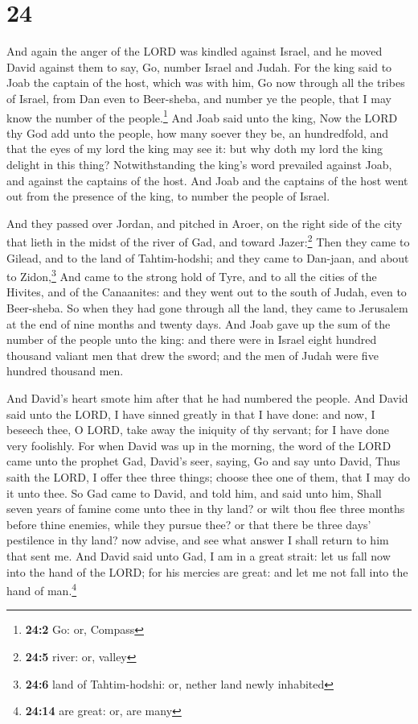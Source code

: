 \hypertarget{section-23}{%
\section{24}\label{section-23}}

 And again the anger of the LORD was kindled against
Israel, and he moved David against them to say, Go, number Israel and
Judah.  For the king said to Joab the captain of the host,
which was with him, Go now through all the tribes of Israel, from Dan
even to Beer-sheba, and number ye the people, that I may know the number
of the people.\footnote{\textbf{24:2} Go: or, Compass} 
And Joab said unto the king, Now the LORD thy God add unto the people,
how many soever they be, an hundredfold, and that the eyes of my lord
the king may see it: but why doth my lord the king delight in this
thing?  Notwithstanding the king's word prevailed against
Joab, and against the captains of the host. And Joab and the captains of
the host went out from the presence of the king, to number the people of
Israel.

 And they passed over Jordan, and pitched in Aroer, on the
right side of the city that lieth in the midst of the river of Gad, and
toward Jazer:\footnote{\textbf{24:5} river: or, valley} 
Then they came to Gilead, and to the land of Tahtim-hodshi; and they
came to Dan-jaan, and about to Zidon,\footnote{\textbf{24:6} land of
  Tahtim-hodshi: or, nether land newly inhabited}  And
came to the strong hold of Tyre, and to all the cities of the Hivites,
and of the Canaanites: and they went out to the south of Judah, even to
Beer-sheba.  So when they had gone through all the land,
they came to Jerusalem at the end of nine months and twenty days.
 And Joab gave up the sum of the number of the people unto
the king: and there were in Israel eight hundred thousand valiant men
that drew the sword; and the men of Judah were five hundred thousand
men.

 And David's heart smote him after that he had numbered
the people. And David said unto the LORD, I have sinned greatly in that
I have done: and now, I beseech thee, O LORD, take away the iniquity of
thy servant; for I have done very foolishly.  For when
David was up in the morning, the word of the LORD came unto the prophet
Gad, David's seer, saying,  Go and say unto David, Thus
saith the LORD, I offer thee three things; choose thee one of them, that
I may do it unto thee.  So Gad came to David, and told
him, and said unto him, Shall seven years of famine come unto thee in
thy land? or wilt thou flee three months before thine enemies, while
they pursue thee? or that there be three days' pestilence in thy land?
now advise, and see what answer I shall return to him that sent me.
 And David said unto Gad, I am in a great strait: let us
fall now into the hand of the LORD; for his mercies are great: and let
me not fall into the hand of man.\footnote{\textbf{24:14} are great: or,
  are many}

